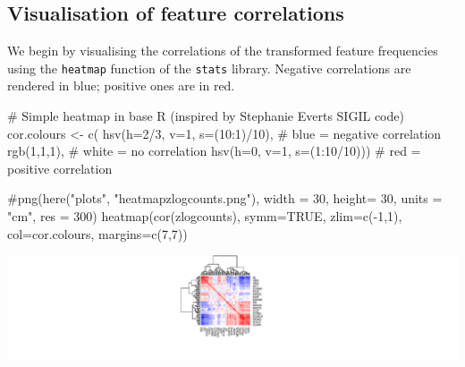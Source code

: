 \documentclass[
  letterpaper,
  DIV=11,
  numbers=noendperiod]{scrreprt}
\newenvironment{Shaded}{\begin{snugshade}}{\end{snugshade}}
\newcommand{\AttributeTok}[1]{\textcolor[rgb]{0.40,0.45,0.13}{#1}}
\newcommand{\CommentTok}[1]{\textcolor[rgb]{0.37,0.37,0.37}{#1}}
\newcommand{\ConstantTok}[1]{\textcolor[rgb]{0.56,0.35,0.01}{#1}}
\newcommand{\DecValTok}[1]{\textcolor[rgb]{0.68,0.00,0.00}{#1}}
\newcommand{\FunctionTok}[1]{\textcolor[rgb]{0.28,0.35,0.67}{#1}}
\newcommand{\NormalTok}[1]{\textcolor[rgb]{0.00,0.23,0.31}{#1}}
\newcommand{\OtherTok}[1]{\textcolor[rgb]{0.00,0.23,0.31}{#1}}
\newcommand{\SpecialCharTok}[1]{\textcolor[rgb]{0.37,0.37,0.37}{#1}}
\begin{document}
\subsection{Visualisation of feature
correlations}\label{visualisation-of-feature-correlations}

We begin by visualising the correlations of the transformed feature
frequencies using the \texttt{heatmap} function of the \texttt{stats}
library. Negative correlations are rendered in blue; positive ones are
in red.

\begin{Shaded}
\begin{Highlighting}[]
\CommentTok{\# Simple heatmap in base R (inspired by Stephanie Evert\textquotesingle{}s SIGIL code)}
\NormalTok{cor.colours }\OtherTok{\textless{}{-}} \FunctionTok{c}\NormalTok{(}
  \FunctionTok{hsv}\NormalTok{(}\AttributeTok{h=}\DecValTok{2}\SpecialCharTok{/}\DecValTok{3}\NormalTok{, }\AttributeTok{v=}\DecValTok{1}\NormalTok{, }\AttributeTok{s=}\NormalTok{(}\DecValTok{10}\SpecialCharTok{:}\DecValTok{1}\NormalTok{)}\SpecialCharTok{/}\DecValTok{10}\NormalTok{), }\CommentTok{\# blue = negative correlation }
  \FunctionTok{rgb}\NormalTok{(}\DecValTok{1}\NormalTok{,}\DecValTok{1}\NormalTok{,}\DecValTok{1}\NormalTok{), }\CommentTok{\# white = no correlation }
  \FunctionTok{hsv}\NormalTok{(}\AttributeTok{h=}\DecValTok{0}\NormalTok{, }\AttributeTok{v=}\DecValTok{1}\NormalTok{, }\AttributeTok{s=}\NormalTok{(}\DecValTok{1}\SpecialCharTok{:}\DecValTok{10}\SpecialCharTok{/}\DecValTok{10}\NormalTok{))) }\CommentTok{\# red = positive correlation}

\CommentTok{\#png(here("plots", "heatmapzlogcounts.png"), width = 30, height= 30, units = "cm", res = 300)}
\FunctionTok{heatmap}\NormalTok{(}\FunctionTok{cor}\NormalTok{(zlogcounts), }
        \AttributeTok{symm=}\ConstantTok{TRUE}\NormalTok{, }
        \AttributeTok{zlim=}\FunctionTok{c}\NormalTok{(}\SpecialCharTok{{-}}\DecValTok{1}\NormalTok{,}\DecValTok{1}\NormalTok{), }
        \AttributeTok{col=}\NormalTok{cor.colours, }
        \AttributeTok{margins=}\FunctionTok{c}\NormalTok{(}\DecValTok{7}\NormalTok{,}\DecValTok{7}\NormalTok{))}
\end{Highlighting}
\end{Shaded}

\includegraphics{F_Ch7_DataPrep_files/figure-pdf/heatmap-1.pdf}
\end{document}
